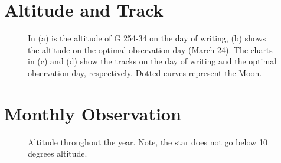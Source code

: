 \documentclass{aastex62}
\begin{document}
\newpage
\section{Altitude and Track}

\begin{figure}[ht!]

\caption{In (a) is the altitude of G 254-34 on the day of writing, (b) shows the altitude on the optimal observation day (March 24). The charts in (c) and (d) show the tracks on the day of writing and the optimal observation day, respectively. Dotted curves represent the Moon.}
\end{figure}

\newpage
\section{Monthly Observation}

\begin{figure}[ht!]
\caption{Altitude throughout the year. Note, the star does not go below 10 degrees altitude.}
\end{figure}
\end{document}
